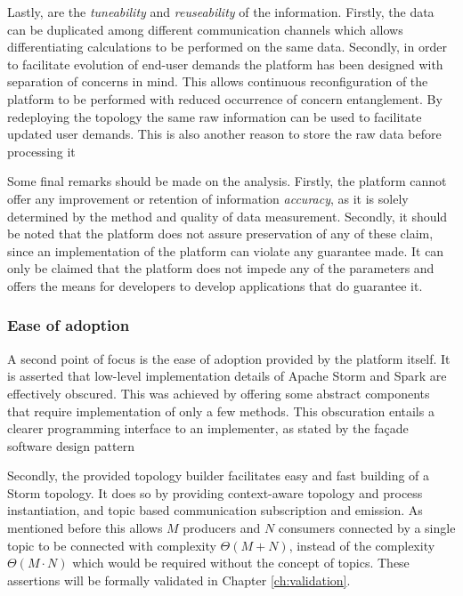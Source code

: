 Lastly, are the \emph{tuneability} and \emph{reuseability} of the information. Firstly, the data can be duplicated among different communication channels which allows differentiating calculations to be performed on the same data. Secondly, in order to facilitate evolution of end-user demands the platform has been designed with separation of concerns in mind. This allows continuous reconfiguration of the platform to be performed with reduced occurrence of concern entanglement. By redeploying the topology the same raw information can be used to facilitate updated user demands. This is also another reason to store the raw data before processing it

Some final remarks should be made on the analysis. Firstly, the platform cannot offer any improvement or retention of information \emph{accuracy}, as it is solely determined by the method and quality of data measurement. Secondly, it should be noted that the platform does not assure preservation of any of these claim, since an implementation of the platform can violate any guarantee made. It can only be claimed that the platform does not impede any of the parameters and offers the means for developers to develop applications that do guarantee it.

\subsubsection*{Ease of adoption}
A second point of focus is the ease of adoption provided by the platform itself. It is asserted that low-level implementation details of Apache Storm and Spark are effectively obscured. This was achieved by offering some abstract components that require implementation of only a few methods. This obscuration entails a clearer programming interface to an implementer, as stated by the fa\c{c}ade software design pattern \cite{facade_pattern}

Secondly, the provided topology builder facilitates easy and fast building of a Storm topology. It does so by providing context-aware topology and process instantiation, and topic based communication subscription and emission.  As mentioned before this allows $M$ producers and $N$ consumers connected by a single topic to be connected with complexity $\Theta(M+N)$, instead of the complexity $\Theta(M\cdot N)$ which would be required without the concept of topics. These assertions will be formally validated in Chapter \ref{ch:validation}.

